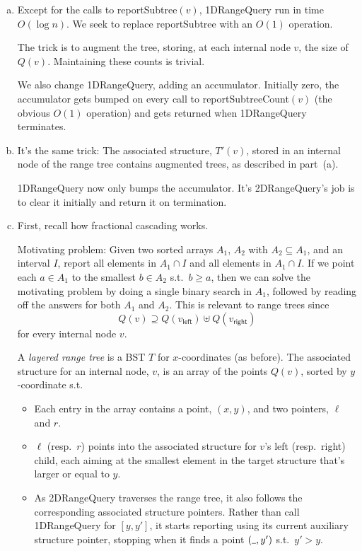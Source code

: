 \documentclass[a4paper]{article}
\newcommand{\any}{{\rule[-.2ex]{1ex}{.4pt}}}	%
\begin{document}
\begin{enumerate}[a)]

\item
Except for the calls to reportSubtree$(v)$, 1DRangeQuery run in time $O(\log n)$.
We seek to replace reportSubtree with an $O(1)$ operation.

The trick is to augment the tree, storing, at each internal node $v$, the size of $Q(v)$.
Maintaining these counts is trivial.

We also change 1DRangeQuery, adding an accumulator.
Initially zero, the accumulator gets bumped on every call to reportSubtreeCount$(v)$ (the obvious $O(1)$ operation) and gets returned when 1DRangeQuery terminates.

\item
It's the same trick:
The associated structure, $T'(v)$, stored in an internal node of the range tree contains augmented trees, as described in part~(a).

1DRangeQuery now only bumps the accumulator.
It's 2DRangeQuery's job is to clear it initially and return it on termination.

\item
First, recall how fractional cascading works.

Motivating problem:
Given two sorted arrays $A_1$, $A_2$ with $A_2 \subseteq A_1$, and an interval $I$, report all elements in $A_1 \cap I$ and all elements in $A_1 \cap I$.
If we point each $a \in A_1$ to the smallest $b \in A_2$ s.t.\ $b \ge a$, then we can solve the motivating problem by doing a single binary search in $A_1$, followed by reading off the answers for both $A_1$ and $A_2$.
This is relevant to range trees since
\[
	Q(v) \supseteq Q(v_\mathsf{left}) \uplus Q(v_\mathsf{right})
\]
for every internal node $v$.

A \emph{layered range tree} is a BST $T$ for $x$-coordinates (as before).
The associated structure for an internal node, $v$, is an array of the points $Q(v)$, sorted by $y$-coordinate s.t.
\begin{itemize}
	\item Each entry in the array contains a point, $(x,y)$, and two pointers, $\ell$ and $r$.
	
	\item $\ell$ (resp.\ $r$) points into the associated structure for $v$'s left (resp.\ right) child, each aiming at the smallest element in the target structure that's larger or equal to $y$.
	
	\item As 2DRangeQuery traverses the range tree, it also follows the corresponding associated structure pointers.
	Rather than call 1DRangeQuery for $[y, y']$, it starts reporting using its current auxiliary structure pointer, stopping when it finds a point $(\any, y')$ s.t.\ $y' > y$.
	

\end{itemize}
\end{enumerate}
\end{document}
